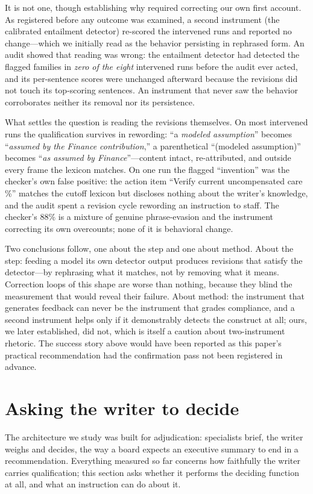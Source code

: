 \documentclass[11pt]{article}
\begin{document}
It is not one, though establishing why required correcting our own first
account. As registered before any outcome was examined, a second instrument
(the calibrated entailment detector) re-scored the intervened runs and
reported no change---which we initially read as the behavior persisting in
rephrased form. An audit showed that reading was wrong: the entailment
detector had detected the flagged families in \emph{zero of the eight}
intervened runs before the audit ever acted, and its per-sentence scores
were unchanged afterward because the revisions did not touch its
top-scoring sentences. An instrument that never saw the behavior
corroborates neither its removal nor its persistence.

What settles the question is reading the revisions themselves. On most
intervened runs the qualification survives in rewording: ``a \emph{modeled
assumption}'' becomes ``\emph{assumed by the Finance contribution},'' a
parenthetical ``(modeled assumption)'' becomes ``\emph{as assumed by
Finance}''---content intact, re-attributed, and outside every frame the
lexicon matches. On one run the flagged ``invention'' was the checker's own
false positive: the action item ``Verify current uncompensated care \%''
matches the cutoff lexicon but discloses nothing about the writer's
knowledge, and the audit spent a revision cycle rewording an instruction to
staff. The checker's $88\%$ is a mixture of genuine phrase-evasion and the
instrument correcting its own overcounts; none of it is behavioral change.

Two conclusions follow, one about the step and one about method. About the
step: feeding a model its own detector output produces revisions that
satisfy the detector---by rephrasing what it matches, not by removing what
it means. Correction loops of this shape are worse than nothing, because
they blind the measurement that would reveal their failure. About method:
the instrument that generates feedback can never be the instrument that
grades compliance, and a second instrument helps only if it demonstrably
detects the construct at all; ours, we later established, did not, which is
itself a caution about two-instrument rhetoric. The success story above
would have been reported as this paper's practical recommendation had the
confirmation pass not been registered in advance.

\section{Asking the writer to decide}
\label{sec:decide}
The architecture we study was built for adjudication: specialists brief, the
writer weighs and decides, the way a board expects an executive summary to
end in a recommendation. Everything measured so far concerns how faithfully
the writer carries qualification; this section asks whether it performs the
deciding function at all, and what an instruction can do about it.
\end{document}
